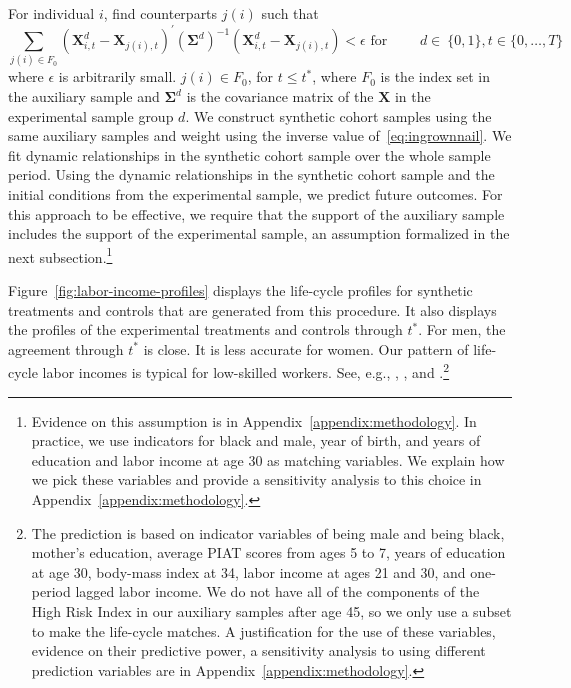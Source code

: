 For individual $i$, find counterparts $j(i)$ such that
\begin{equation}\label{eq:ingrownnail}
\sum_{j(i)\in F_0} \left( \bm{X}^{d}_{i,t} - \bm{X}_{j(i),t} \right)^{\prime} {\left( \bm{\Sigma}^d\right)}^{-1} \left(\bm{X}^{d}_{i,t} - \bm{X}_{j(i),t} \right) < \epsilon \text{ for } \qquad d \in \ \{0,1\}, t \in \{0,\dots,T\}
\end{equation}
where $\epsilon$ is arbitrarily small. $j(i) \in F_0$, for $t \leq t^{\ast}$, where $F_0$ is the index set in the auxiliary sample and $\bm{\Sigma}^d$ is the covariance matrix of the $\bm{X}$ in the experimental sample group $d$. We construct synthetic cohort samples using the same auxiliary samples and weight using the inverse value of~\eqref{eq:ingrownnail}. We fit dynamic relationships in the synthetic cohort sample over the whole sample period. Using the dynamic relationships in the synthetic cohort sample and the initial conditions from the experimental sample, we predict future outcomes. For this approach to be effective, we require that the support of the auxiliary sample includes the support of the experimental sample, an assumption formalized in the next subsection.\footnote{Evidence on this assumption is in Appendix~\ref{appendix:methodology}. In practice, we use indicators for black and male, year of birth, and years of education and labor income at age 30 as matching variables. We explain how we pick these variables and provide a sensitivity analysis to this choice in Appendix~\ref{appendix:methodology}.}


Figure~\ref{fig:labor-income-profiles} displays the life-cycle profiles for synthetic treatments and controls that are generated from this procedure. It also displays the profiles of the experimental treatments and controls through $t^*$. For men, the agreement through $t^*$ is close. It is less accurate for women. Our pattern of life-cycle labor incomes is typical for low-skilled workers. See, e.g., \citet{Blundell-etal_2015_J-Pub-E}, \citet{Gladden_Taber_2000_WageProgression}, and \citet{Sanders-Taber_2012_AR}.\footnote{The prediction is based on indicator variables of being male and being black, mother's education, average PIAT scores from ages 5 to 7, years of education at age 30, body-mass index at 34, labor income at ages 21 and 30, and one-period lagged labor income. We do not have all of the components of the High Risk Index in our auxiliary samples after age 45, so we only use a subset to make the life-cycle matches. A justification for the use of these variables, evidence on their predictive power, a sensitivity analysis to using different prediction variables are in Appendix~\ref{appendix:methodology}.}

